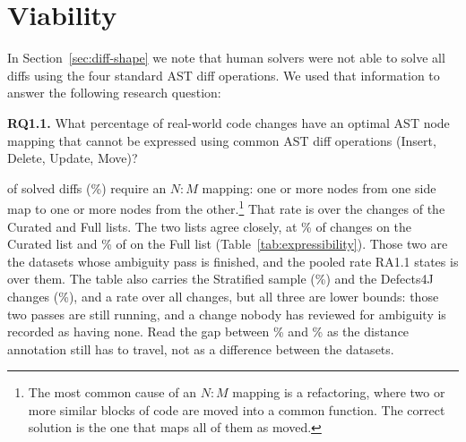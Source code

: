 \documentclass[sigconf]{acmart}
\begin{document}
\section{Viability}
\label{sec:viability}

In Section~\ref{sec:diff-shape} we note that human solvers were not able to solve all diffs using
the four standard AST diff operations. We used that information to answer the following research question:

\textbf{RQ1.1.} What percentage of real-world code changes have an optimal AST node mapping that
cannot be expressed using common AST diff operations (Insert, Delete, Update, Move)?

\AmbiguityListWith{} of \AmbiguityListScored{} solved diffs (\AmbiguityListPct{}\%) require an
$N{:}M$ mapping: one or more nodes from one side map to one or more nodes from the
other.\footnote{The most common cause of an $N{:}M$ mapping is a refactoring, where two or more
similar blocks of code are moved into a common function. The correct solution is the one that maps
all of them as moved.} That rate is over the \AmbiguityListScored{} changes of the Curated and Full
lists. The two lists agree closely, at \AmbiguityCuratedPct{}\% of \AmbiguityCuratedTotal{}
changes on the Curated list and \AmbiguityFullPct{}\% of \AmbiguityFullTotal{} on the Full list
(Table~\ref{tab:expressibility}). Those two are the datasets whose ambiguity pass is finished, and
the pooled rate RA1.1 states is over them. The table also carries the Stratified sample
(\AmbiguityStratifiedPct{}\%) and the Defects4J changes (\AmbiguityDefectsFourJPct{}\%), and a rate
over all \AmbiguityScored{} changes, but all three are lower bounds: those two passes are still
running, and a change nobody has reviewed for ambiguity is recorded as having none. Read the gap
between \AmbiguityListPct{}\% and \AmbiguityAnyPct{}\% as the distance annotation still has to
travel, not as a difference between the datasets.
\end{document}
